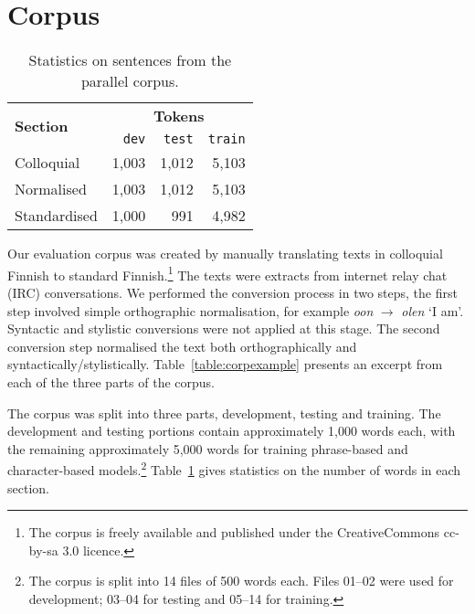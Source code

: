 \documentclass[11pt]{article}
\begin{document}
\section{Corpus}

\begin{table}
  \centering
 \begin{tabular}{|l|r|r|r|}
    \hline
    \multirow{2}{*}{\textbf{Section}} & \multicolumn{3}{|c|}{\textbf{Tokens}} \\\cline{2-4}
                                      & \texttt{dev} & \texttt{test} & \texttt{train} \\
    \hline
    Colloquial                           & 1,003 & 1,012 & 5,103 \\ 
    Normalised                           & 1,003 & 1,012 & 5,103 \\ 
    Standardised                         & 1,000 & 991 & 4,982 \\
    \hline
 \end{tabular} 
  \caption{Statistics on sentences from the parallel corpus.}
  \label{table:corpsize}
\end{table}


Our evaluation corpus was created by manually translating texts in colloquial Finnish
to standard Finnish.\footnote{The corpus is freely available and published under the 
CreativeCommons {\sc cc-by-sa} 3.0 licence.} The texts were extracts from internet 
relay chat (IRC) conversations. We performed the conversion process in two steps, the first
step involved simple orthographic normalisation, for 
example \emph{oon} $\rightarrow$ \emph{olen} `I am'. Syntactic and stylistic conversions 
were not applied at this stage. The second conversion step normalised the text
both orthographically and syntactically/stylistically. Table~\ref{table:corpexample} presents
an excerpt from each of the three parts of the corpus.

The corpus was split into three parts, development, testing and training. The development and testing portions contain approximately 1,000 words each, with the remaining approximately 5,000 words for training
phrase-based and character-based models.\footnote{The corpus is split into 14 files of 500 words each. Files 01--02 
  were used for development; 03--04 for testing and 05--14 for training.} Table~\ref{table:corpsize} gives statistics on the number of words in each section.
\end{document}
